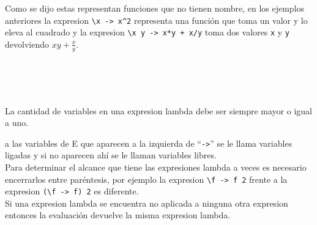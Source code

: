       \begin{fxcode}
      \end{fxcode}
         
      \begin{fxcode}
      \end{fxcode}
      
      Como se dijo estas representan funciones que no tienen nombre, en los ejemplos anteriores la expresion \texttt{\textbackslash x ->~x\^{}2} representa una función que toma un valor y lo eleva al cuadrado y la expresion \texttt{\textbackslash x y ->~x*y + x/y} toma dos valores \texttt{x} y \texttt{y} devolviendo $xy + \frac{x}{y}$.
      
      \begin{fxcode}
         \\
         \\
         \\
      \end{fxcode}
      
      La cantidad de variables en una expresion lambda debe ser siempre mayor o igual a uno.
      
      \begin{fxcode}
          
      \end{fxcode}
      
      a las variables de E que aparecen a la izquierda de ``\texttt{->}'' se le llama variables ligadas y si no aparecen ahí se le llaman variables libres.
      \\
      
      Para determinar el alcance que tiene las expresiones lambda a veces es necesario encerrarlos entre paréntesis, por ejemplo la expresion \texttt{\textbackslash f ->~f 2} frente a la expresion \texttt{(\textbackslash f -> f) 2} es diferente.
      \\
      
      Si una expresion lambda se encuentra no aplicada a ninguna otra expresion entonces la evaluación devuelve la misma expresion lambda.
      
      \begin{fxcode}
         \\
         \\
         \\
      \end{fxcode}
      

